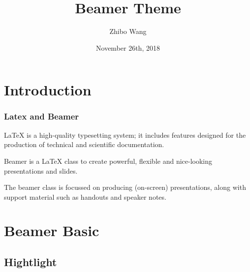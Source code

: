 \usepackage[english]{babel}
\usepackage{amsmath,amssymb,amstext} %
\usepackage{float}
\usepackage{array}           %
\usepackage{fancyhdr}        %
\usepackage{graphicx}        %
\usepackage{lmodern}
\usepackage{xcolor}
\usepackage{algorithm2e}
\usepackage{booktabs}

\author{Zhibo Wang}
\title{Beamer Theme}
\date{November 26th, 2018}




    \frame[plain]{\titlepage}

    \section{Introduction}

    \begin{frame}
        \frametitle{Latex and Beamer}
        
        LaTeX is a high-quality typesetting system; 
        it includes features designed for the production of 
        technical and scientific documentation.

        \vspace{0.4cm}

        \pause

        Beamer is a LaTeX class to create powerful, 
        flexible and nice-looking presentations and slides. 
        
        The beamer class is focussed on producing (on-screen) presentations, 
        along with support material such as handouts and speaker notes.
        
    \end{frame}

    \section{Beamer Basic}
    \subsection{Hightlight}

